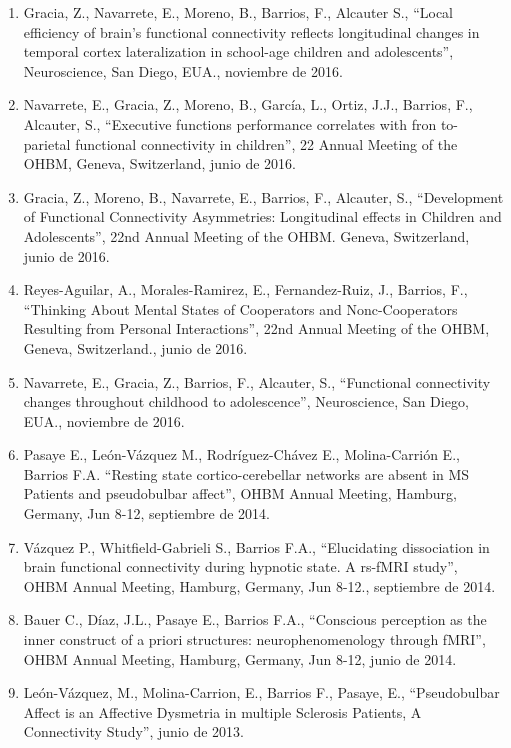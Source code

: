 \begin{enumerate}
\item Gracia, Z., Navarrete, E., Moreno, B., Barrios, F., Alcauter S., “Local efficiency of brain’s functional connectivity reflects 
longitudinal 
changes in temporal cortex lateralization in school-age children and adolescents”, Neuroscience, San Diego, EUA., noviembre de 2016.

\item Navarrete, E., Gracia, Z., Moreno, B., García, L., Ortiz, J.J., Barrios, F., Alcauter, S., “Executive functions performance correlates 
with 
fron to-parietal functional connectivity in children”, 22 Annual Meeting of the OHBM, Geneva, Switzerland, junio de 2016.

\item Gracia, Z., Moreno, B., Navarrete, E., Barrios, F., Alcauter, S., “Development of Functional Connectivity Asymmetries: Longitudinal 
effects 
in Children and Adolescents”, 22nd Annual Meeting of the OHBM. Geneva, Switzerland, junio de 2016.

\item Reyes-Aguilar, A., Morales-Ramirez, E., Fernandez-Ruiz, J., Barrios, F., “Thinking About Mental States of Cooperators and 
Nonc-Cooperators 
Resulting from Personal Interactions”, 22nd Annual Meeting of the OHBM, Geneva, Switzerland., junio de 2016.

\item Navarrete, E., Gracia, Z., Barrios, F., Alcauter, S., “Functional connectivity changes throughout childhood to adolescence”, 
Neuroscience, 
San Diego, EUA., noviembre de 2016.

\item Pasaye E., León-Vázquez M., Rodríguez-Chávez E., Molina-Carrión E., Barrios F.A. “Resting state cortico-cerebellar networks are absent 
in MS 
Patients and pseudobulbar affect”, OHBM Annual Meeting, Hamburg, Germany, Jun 8-12, septiembre de 2014.

\item Vázquez P., Whitfield-Gabrieli S., Barrios F.A., “Elucidating dissociation in brain functional connectivity during hypnotic state. A 
rs-fMRI 
study”, OHBM Annual Meeting, Hamburg, Germany, Jun 8-12., septiembre de 2014.

\item Bauer C., Díaz, J.L., Pasaye E., Barrios F.A., “Conscious perception as the inner construct of a priori structures: neurophenomenology 
through fMRI”, OHBM Annual Meeting, Hamburg, Germany, Jun 8-12, junio de 2014.

\item León-Vázquez, M., Molina-Carrion, E., Barrios F., Pasaye, E., “Pseudobulbar Affect is an Affective Dysmetria in multiple Sclerosis 
Patients, 
A Connectivity Study”, junio de 2013.


\end{enumerate}
